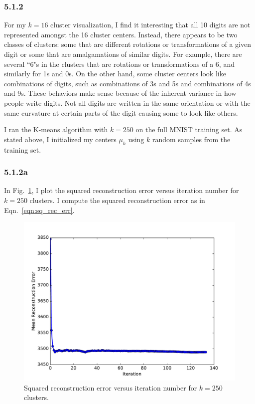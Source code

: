 \documentclass[12pt]{amsart}
\begin{document}
\subsubsection*{5.1.2}

For my $k = 16$ cluster visualization, I find it interesting that all 10 digits are not represented amongst the 16 cluster centers.  Instead, there appears to be two classes of clusters: some that are different rotations or transformations of a given digit or some that are amalgamations of similar digits.  For example, there are several ``6"s in the clusters that are rotations or transformations of a 6, and similarly for 1s and 0s.  On the other hand, some cluster centers look like combinations of digits, such as combinations of 3s and 5s and combinations of 4s and 9s.  These behaviors make sense because of the inherent variance in how people write digits.  Not all digits are written in the same orientation or with the same curvature at certain parts of the digit causing some to look like others.

I ran the K-means algorithm with $k = 250$ on the full MNIST training set.  As stated above, I initialized my centers $\mu_k$ using $k$ random samples from the training set.

\subsubsection*{5.1.2a}

In Fig.~\ref{fig:k_250_rec_err}, I plot the squared reconstruction error versus iteration number for $k = 250$ clusters.  I compute the squared reconstruction error as in Eqn.~\ref{eqn:sq_rec_err}.
\begin{figure}[H]
	\includegraphics[width=\columnwidth]{k_250_rec_err.pdf}
    \caption{Squared reconstruction error versus iteration number for $k = 250$ clusters.}
    \label{fig:k_250_rec_err}
\end{figure}
\end{document}
